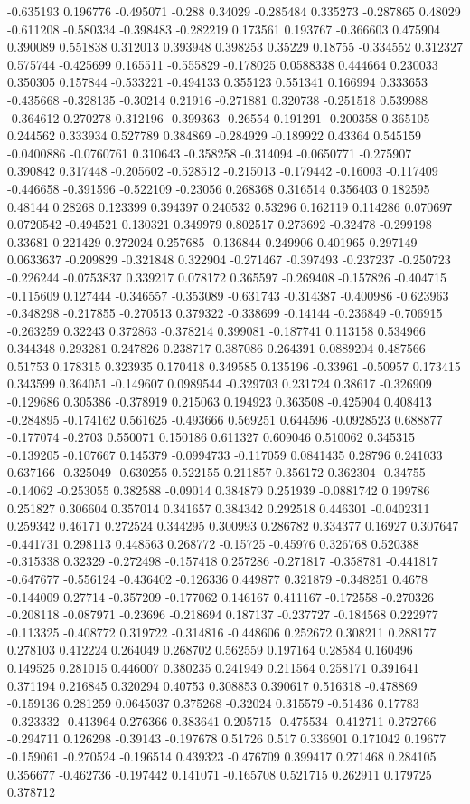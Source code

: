 -0.635193 0.196776 -0.495071 -0.288 0.34029 -0.285484 0.335273 -0.287865 0.48029 -0.611208 -0.580334 -0.398483 -0.282219 0.173561 0.193767 -0.366603 0.475904 0.390089 0.551838 0.312013 0.393948 0.398253 0.35229 0.18755 -0.334552 0.312327 0.575744 -0.425699 0.165511 -0.555829 -0.178025 0.0588338 0.444664 0.230033 0.350305 0.157844 -0.533221 -0.494133 0.355123 0.551341 0.166994 0.333653 -0.435668 -0.328135 -0.30214 0.21916 -0.271881 0.320738 -0.251518 0.539988 -0.364612 0.270278 0.312196 -0.399363 -0.26554 0.191291 -0.200358 0.365105 0.244562 0.333934 0.527789 0.384869 -0.284929 -0.189922 0.43364 0.545159 -0.0400886 -0.0760761 0.310643 -0.358258 -0.314094 -0.0650771 -0.275907 0.390842 0.317448 -0.205602 -0.528512 -0.215013 -0.179442 -0.16003 -0.117409 -0.446658 -0.391596 -0.522109 -0.23056 0.268368 0.316514 0.356403 0.182595 0.48144 0.28268 0.123399 0.394397 0.240532 0.53296 0.162119 0.114286 0.070697 0.0720542 -0.494521 0.130321 0.349979 0.802517 0.273692 -0.32478 -0.299198 0.33681 0.221429 0.272024 0.257685 -0.136844 0.249906 0.401965 0.297149 0.0633637 -0.209829 -0.321848 0.322904 -0.271467 -0.397493 -0.237237 -0.250723 -0.226244 -0.0753837 0.339217 0.078172 0.365597 -0.269408 -0.157826 -0.404715 -0.115609 0.127444 -0.346557 -0.353089 -0.631743 -0.314387 -0.400986 -0.623963 -0.348298 -0.217855 -0.270513 0.379322 -0.338699 -0.14144 -0.236849 -0.706915 -0.263259 0.32243 0.372863 -0.378214 0.399081 -0.187741 0.113158 0.534966 0.344348 0.293281 0.247826 0.238717 0.387086 0.264391 0.0889204 0.487566 0.51753 0.178315 0.323935 0.170418 0.349585 0.135196 -0.33961 -0.50957 0.173415 0.343599 0.364051 -0.149607 0.0989544 -0.329703 0.231724 0.38617 -0.326909 -0.129686 0.305386 -0.378919 0.215063 0.194923 0.363508 -0.425904 0.408413 -0.284895 -0.174162 0.561625 -0.493666 0.569251 0.644596 -0.0928523 0.688877 -0.177074 -0.2703 0.550071 0.150186 0.611327 0.609046 0.510062 0.345315 -0.139205 -0.107667 0.145379 -0.0994733 -0.117059 0.0841435 0.28796 0.241033 0.637166 -0.325049 -0.630255 0.522155 0.211857 0.356172 0.362304 -0.34755 -0.14062 -0.253055 0.382588 -0.09014 0.384879 0.251939 -0.0881742 0.199786 0.251827 0.306604 0.357014 0.341657 0.384342 0.292518 0.446301 -0.0402311 0.259342 0.46171 0.272524 0.344295 0.300993 0.286782 0.334377 0.16927 0.307647 -0.441731 0.298113 0.448563 0.268772 -0.15725 -0.45976 0.326768 0.520388 -0.315338 0.32329 -0.272498 -0.157418 0.257286 -0.271817 -0.358781 -0.441817 -0.647677 -0.556124 -0.436402 -0.126336 0.449877 0.321879 -0.348251 0.4678 -0.144009 0.27714 -0.357209 -0.177062 0.146167 0.411167 -0.172558 -0.270326 -0.208118 -0.087971 -0.23696 -0.218694 0.187137 -0.237727 -0.184568 0.222977 -0.113325 -0.408772 0.319722 -0.314816 -0.448606 0.252672 0.308211 0.288177 0.278103 0.412224 0.264049 0.268702 0.562559 0.197164 0.28584 0.160496 0.149525 0.281015 0.446007 0.380235 0.241949 0.211564 0.258171 0.391641 0.371194 0.216845 0.320294 0.40753 0.308853 0.390617 0.516318 -0.478869 -0.159136 0.281259 0.0645037 0.375268 -0.32024 0.315579 -0.51436 0.17783 -0.323332 -0.413964 0.276366 0.383641 0.205715 -0.475534 -0.412711 0.272766 -0.294711 0.126298 -0.39143 -0.197678 0.51726 0.517 0.336901 0.171042 0.19677 -0.159061 -0.270524 -0.196514 0.439323 -0.476709 0.399417 0.271468 0.284105 0.356677 -0.462736 -0.197442 0.141071 -0.165708 0.521715 0.262911 0.179725 0.378712 